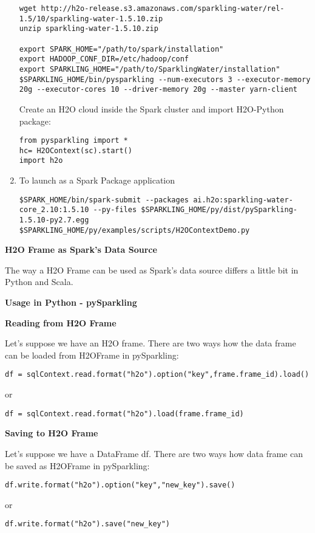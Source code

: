 \begin{enumerate}
\begin{lstlisting}[style=Bash]
wget http://h2o-release.s3.amazonaws.com/sparkling-water/rel-1.5/10/sparkling-water-1.5.10.zip
unzip sparkling-water-1.5.10.zip
 
export SPARK_HOME="/path/to/spark/installation"
export HADOOP_CONF_DIR=/etc/hadoop/conf
export SPARKLING_HOME="/path/to/SparklingWater/installation"
$SPARKLING_HOME/bin/pysparkling --num-executors 3 --executor-memory 20g --executor-cores 10 --driver-memory 20g --master yarn-client
\end{lstlisting}
    
Create an H2O cloud inside the Spark cluster and import H2O-Python package:
\begin{lstlisting}[style=Scala]
from pysparkling import *
hc= H2OContext(sc).start()
import h2o
\end{lstlisting}

\item To launch as a Spark Package application
\begin{lstlisting}[style=Bash]
$SPARK_HOME/bin/spark-submit --packages ai.h2o:sparkling-water-core_2.10:1.5.10 --py-files $SPARKLING_HOME/py/dist/pySparkling-1.5.10-py2.7.egg
$SPARKLING_HOME/py/examples/scripts/H2OContextDemo.py 
\end{lstlisting}
\end{enumerate}

\textbf{H2O Frame as Spark's Data Source}

The way a H2O Frame can be used as Spark's data source differs a little bit in Python and Scala.

\textbf{Usage in Python - pySparkling}

\textbf{Reading from H2O Frame}

Let's suppose we have an H2O frame. There are two ways how the data frame can be loaded from H2OFrame in pySparkling:
\begin{lstlisting}[style=Scala]
df = sqlContext.read.format("h2o").option("key",frame.frame_id).load()
\end{lstlisting}
or
\begin{lstlisting}[style=Scala]
df = sqlContext.read.format("h2o").load(frame.frame_id)
\end{lstlisting}

\textbf{Saving to H2O Frame}

Let's suppose we have a DataFrame df. There are two ways how data frame can be saved as 
H2OFrame in pySparkling:

\begin{lstlisting}[style=Scala]
df.write.format("h2o").option("key","new_key").save()
\end{lstlisting}
or
\begin{lstlisting}[style=Scala]
df.write.format("h2o").save("new_key")
\end{lstlisting}

